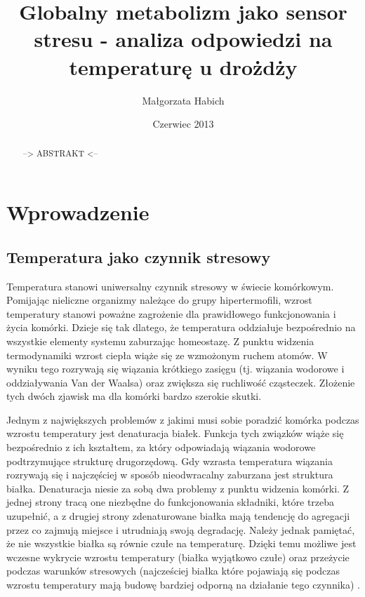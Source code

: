 \documentclass{pracamgr}
\author{Małgorzata Habich}
\title{Globalny metabolizm jako sensor stresu - analiza odpowiedzi na temperaturę u drożdży}
\date{Czerwiec 2013}
\begin{document}
\maketitle

\begin{abstract}
--> ABSTRAKT <--
\end{abstract}

\tableofcontents

\chapter{Wprowadzenie}

\section{Temperatura jako czynnik stresowy}

Temperatura stanowi uniwersalny czynnik stresowy w świecie komórkowym. Pomijając nieliczne organizmy należące do grupy hipertermofili, wzrost temperatury stanowi poważne zagrożenie
dla prawidłowego funkcjonowania i życia komórki. Dzieje się tak dlatego, że temperatura oddziałuje bezpośrednio na wszystkie elementy systemu zaburzając homeostazę. 
Z punktu widzenia termodynamiki wzrost ciepła wiąże się ze wzmożonym ruchem atomów. W wyniku tego rozrywają się wiązania krótkiego zasięgu (tj. wiązania wodorowe i oddziaływania Van der Waalsa) oraz 
zwiększa się ruchliwość cząsteczek. Złożenie tych dwóch zjawisk ma dla komórki bardzo szerokie skutki.

Jednym z największych problemów z jakimi musi sobie poradzić komórka podczas wzrostu temperatury jest denaturacja białek. Funkcja tych związków wiąże się bezpośrednio z ich kształtem, za który odpowiadają 
wiązania wodorowe podtrzymujące strukturę drugorzędową. Gdy wzrasta temperatura wiązania rozrywają się i najczęściej w sposób nieodwracalny zaburzana jest struktura białka. Denaturacja niesie za sobą
dwa problemy z punktu widzenia komórki. Z jednej strony tracą one niezbędne do funkcjonowania składniki, które trzeba uzupełnić, a z drugiej strony zdenaturowane białka mają tendencję
do agregacji przez co zajmują miejsce i utrudniają swoją degradację. Należy jednak pamiętać, że nie wszystkie białka są równie czułe na temperaturę. Dzięki temu możliwe jest wczesne wykrycie wzrostu temperatury (białka
wyjątkowo czułe) oraz przeżycie podczas warunków stresowych (najcześciej białka które pojawiają się podczas wzrostu temperatury mają budowę bardziej odporną na działanie tego czynnika) \cite{TsInEubact}.
\end{document}
